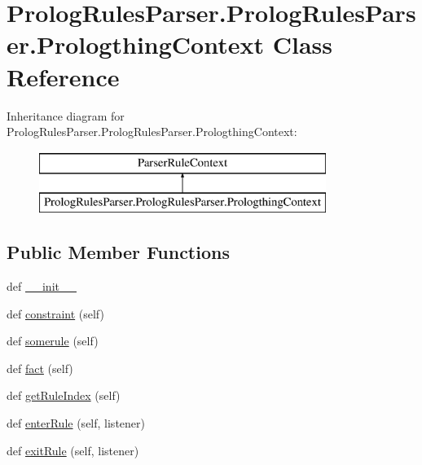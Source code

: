 \hypertarget{class_prolog_rules_parser_1_1_prolog_rules_parser_1_1_prologthing_context}{}\section{Prolog\+Rules\+Parser.\+Prolog\+Rules\+Parser.\+Prologthing\+Context Class Reference}
\label{class_prolog_rules_parser_1_1_prolog_rules_parser_1_1_prologthing_context}
Inheritance diagram for Prolog\+Rules\+Parser.\+Prolog\+Rules\+Parser.\+Prologthing\+Context\+:\begin{figure}[H]
\begin{center}
\leavevmode
\includegraphics[height=2.000000cm]{class_prolog_rules_parser_1_1_prolog_rules_parser_1_1_prologthing_context}
\end{center}
\end{figure}
\subsection*{Public Member Functions}
\begin{DoxyCompactItemize}
\item 
def \hyperlink{class_prolog_rules_parser_1_1_prolog_rules_parser_1_1_prologthing_context_adcba98eda6d9ed588e5c357bb67f107b}{\+\_\+\+\_\+init\+\_\+\+\_\+}
\item 
def \hyperlink{class_prolog_rules_parser_1_1_prolog_rules_parser_1_1_prologthing_context_acc5e58c7cbf376b3b21a56344448c70d}{constraint} (self)
\item 
def \hyperlink{class_prolog_rules_parser_1_1_prolog_rules_parser_1_1_prologthing_context_a23104f4eb5eb94ef5c5ce75ff04a7ccb}{somerule} (self)
\item 
def \hyperlink{class_prolog_rules_parser_1_1_prolog_rules_parser_1_1_prologthing_context_a1cf4eadb0024fe7ca2eaa14eedb6a913}{fact} (self)
\item 
def \hyperlink{class_prolog_rules_parser_1_1_prolog_rules_parser_1_1_prologthing_context_a958dfdc431e70d22be5a98b07a8a49e3}{get\+Rule\+Index} (self)
\item 
def \hyperlink{class_prolog_rules_parser_1_1_prolog_rules_parser_1_1_prologthing_context_ad793b63974053fe247c6402d508772bf}{enter\+Rule} (self, listener)
\item 
def \hyperlink{class_prolog_rules_parser_1_1_prolog_rules_parser_1_1_prologthing_context_ac51c802ca007aa34f64c23083518150f}{exit\+Rule} (self, listener)
\end{DoxyCompactItemize}
